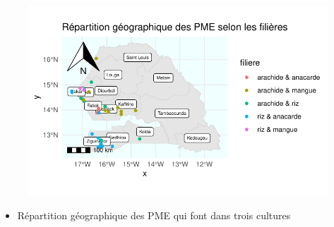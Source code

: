 \documentclass[
  letterpaper,
  DIV=11,
  numbers=noendperiod]{scrartcl}
\providecommand{\tightlist}{%
  \setlength{\itemsep}{0pt}\setlength{\parskip}{0pt}}\usepackage{longtable,booktabs,array}
\begin{document}
\begin{figure}[H]

{\centering \includegraphics{projet_R_files/figure-pdf/unnamed-chunk-43-1.pdf}

}

\end{figure}

\begin{itemize}
\tightlist
\item
  Répartition géographique des PME qui font dans trois cultures
\end{itemize}
\end{document}
